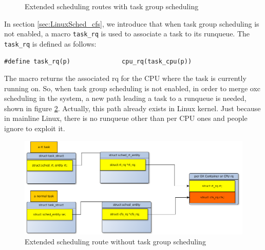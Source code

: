 \begin{figure}[htbp]
\begin{center}
\end{center}
	\caption{Extended scheduling routes with task group scheduling}
	\label{fig:scheduling_route_oxc}
\end{figure}

In section \ref{sec:LinuxSched_cfs}, we introduce that when task group
scheduling is not enabled, a macro \texttt{task\_rq} is used to associate
a task to its runqueue. The \texttt{task\_rq} is defined as follows:
\begin{lstlisting}
#define task_rq(p)              cpu_rq(task_cpu(p))
\end{lstlisting}
The macro returns the associated rq for the CPU where the task is currently 
running on. So, when task group scheduling is not enabled, in order to merge
oxc scheduling in the system, a new path leading a task to a runqueue is 
needed, shown in figure \ref{fig:oxc_task_no_tg}. Actually, this path already 
exists in Linux kernel. Just because in mainline Linux, there is no runqueue 
other than per CPU ones and people ignore to exploit it.  
\begin{figure}[htbp]
        \centering
        \includegraphics[width=\textwidth]{images/oxc_task_no_tg}
        \caption{Extended scheduling route without task group scheduling}
        \label{fig:oxc_task_no_tg}
\end{figure}

